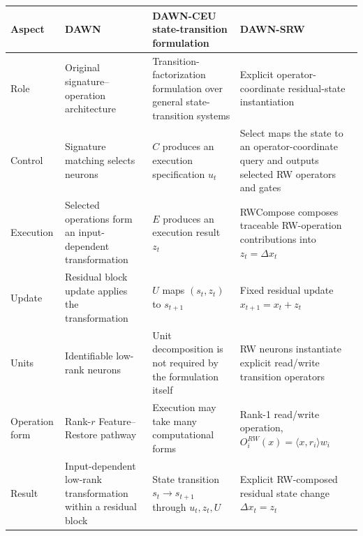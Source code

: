 \documentclass{article}
\begin{document}
\begin{center}
\small
\setlength{\tabcolsep}{4pt}
\renewcommand{\arraystretch}{1.08}
\begin{tabularx}{\textwidth}{lXXX}
\toprule
\textbf{Aspect}
& \textbf{DAWN}
& \textbf{DAWN-CEU state-transition formulation}
& \textbf{DAWN-SRW} \\
\midrule
Role
& Original signature--operation architecture
& Transition-factorization formulation over general state-transition systems
& Explicit operator-coordinate residual-state instantiation \\

Control
& Signature matching selects neurons
& \(C\) produces an execution specification \(u_t\)
& Select maps the state to an operator-coordinate query and outputs selected RW operators and gates \\

Execution
& Selected operations form an input-dependent transformation
& \(E\) produces an execution result \(z_t\)
& RWCompose composes traceable RW-operation contributions into \(z_t=\Delta x_t\) \\

Update
& Residual block update applies the transformation
& \(U\) maps \((s_t,z_t)\) to \(s_{t+1}\)
& Fixed residual update \(x_{t+1}=x_t+z_t\) \\

Units
& Identifiable low-rank neurons
& Unit decomposition is not required by the formulation itself
& RW neurons instantiate explicit read/write transition operators \\

Operation form
& Rank-\(r\) Feature--Restore pathway
& Execution may take many computational forms
& Rank-1 read/write operation, \(O_i^{RW}(x)=\langle x,r_i\rangle w_i\) \\

Result
& Input-dependent low-rank transformation within a residual block
& State transition \(s_t\rightarrow s_{t+1}\) through \(u_t,z_t,U\)
& Explicit RW-composed residual state change \(\Delta x_t=z_t\) \\
\bottomrule
\end{tabularx}
\label{tab:dawn_to_srw}
\end{center}
\end{document}
